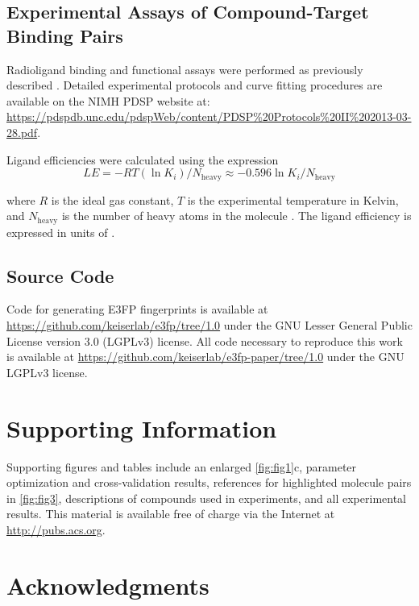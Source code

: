 \documentclass[../main.tex]{subfiles}
\begin{document}
\begin{refsection}
\subsection*{Experimental Assays of Compound-Target Binding Pairs}

Radioligand binding and functional assays were performed as previously described \cite{barnea_2008,xiao_1998,xiao_2006}.
Detailed experimental protocols and curve fitting procedures are available on the NIMH PDSP website at: \url{https://pdspdb.unc.edu/pdspWeb/content/PDSP\%20Protocols\%20II\%202013-03-28.pdf}.

Ligand efficiencies were calculated using the expression
\begin{equation}
    LE = -R T (\ln K_i) / N_\textrm{heavy} \approx -0.596 \ln K_i / N_\textrm{heavy} \nonumber
\end{equation}

where $R$ is the ideal gas constant, $T$ is the experimental temperature in Kelvin, and $N_\textrm{heavy}$ is the number of heavy atoms in the molecule \cite{kuntz_1999}.
The ligand efficiency is expressed in units of \LEunit{}.

\subsection*{Source Code}

Code for generating E3FP fingerprints is available at  \url{https://github.com/keiserlab/e3fp/tree/1.0} under the GNU Lesser General Public License version 3.0 (LGPLv3) license.
All code necessary to reproduce this work is available at  \url{https://github.com/keiserlab/e3fp-paper/tree/1.0} under the GNU LGPLv3 license.

\section{Supporting Information}\label{sec:suppinf}

Supporting figures and tables include an enlarged \cref{fig:fig1}c, parameter optimization and cross-validation results, references for highlighted molecule pairs in \cref{fig:fig3}, descriptions of compounds used in experiments, and all experimental results.
This material is available free of charge via the Internet at \url{http://pubs.acs.org}.

\section*{Acknowledgments}


\end{refsection}
\end{document}
